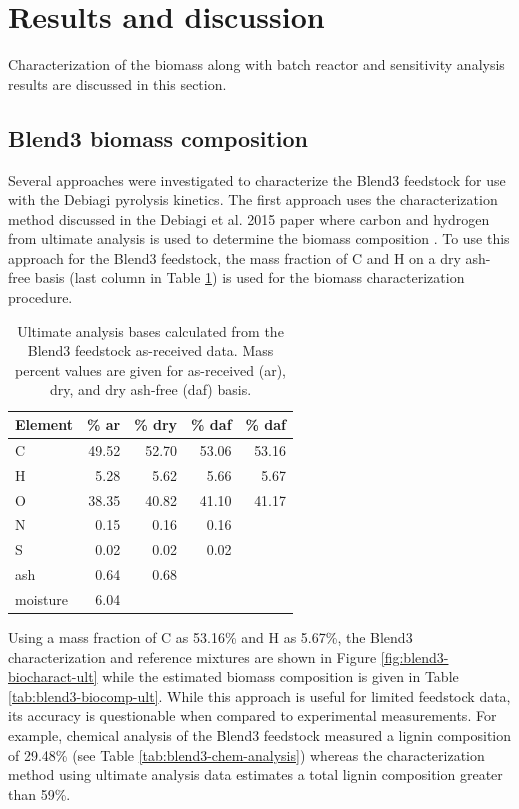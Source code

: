 
\section{Results and discussion}

Characterization of the biomass along with batch reactor and sensitivity analysis results are discussed in this section.

\subsection{Blend3 biomass composition}

Several approaches were investigated to characterize the Blend3 feedstock for use with the Debiagi pyrolysis kinetics. The first approach uses the characterization method discussed in the Debiagi et al. 2015 paper where carbon and hydrogen from ultimate analysis is used to determine the biomass composition \cite{Debiagi-2015}. To use this approach for the Blend3 feedstock, the mass fraction of C and H on a dry ash-free basis (last column in Table \ref{tab:blend3-ult-bases}) is used for the biomass characterization procedure.

\begin{table}[H]
    \centering
    \caption{Ultimate analysis bases calculated from the Blend3 feedstock as-received data. Mass percent values are given for as-received (ar), dry, and dry ash-free (daf) basis.}
    \label{tab:blend3-ult-bases}
    \begin{tabular}{lrrrr}
        \toprule
        Element & \% ar & \% dry & \% daf & \% daf \\
        \midrule
        C        & 49.52 & 52.70 & 53.06 & 53.16 \\
        H        & 5.28  & 5.62  & 5.66  & 5.67  \\
        O        & 38.35 & 40.82 & 41.10 & 41.17 \\
        N        & 0.15  & 0.16  & 0.16  &       \\
        S        & 0.02  & 0.02  & 0.02  &       \\
        ash      & 0.64  & 0.68  &       &       \\
        moisture & 6.04  &       &       &       \\
        \bottomrule
    \end{tabular}
\end{table}

Using a mass fraction of C as 53.16\% and H as 5.67\%, the Blend3 characterization and reference mixtures are shown in Figure \ref{fig:blend3-biocharact-ult} while the estimated biomass composition is given in Table \ref{tab:blend3-biocomp-ult}. While this approach is useful for limited feedstock data, its accuracy is questionable when compared to experimental measurements. For example, chemical analysis of the Blend3 feedstock measured a lignin composition of 29.48\% (see Table \ref{tab:blend3-chem-analysis}) whereas the characterization method using ultimate analysis data estimates a total lignin composition greater than 59\%.

